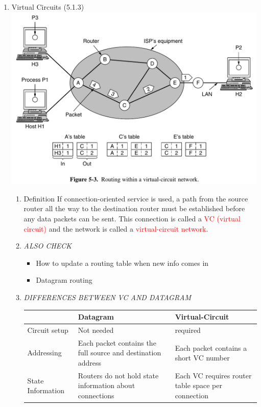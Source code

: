 \documentclass[a4paper,10pt]{article}
\newcommand{\red}[1]{\textcolor{red}{#1}}
\begin{document}
\begin{enumerate}
  \item Virtual Circuits (5.1.3)
    \newline\includegraphics[width=\textwidth]{vc}
    \begin{enumerate}
    \item Definition
      \newline If connection-oriented service is used, a path from the source router all the way to the destination router must be established before any data packets can be sent. This connection is called a \red{VC (virtual circuit)} and the network is called a \red{virtual-circuit network}.
    \item\textit{ALSO CHECK}
      \begin{itemize}
        \item How to update a routing table when new info comes in
        \item Datagram routing
      \end{itemize}
    \newpage\item\textit{DIFFERENCES BETWEEN VC AND DATAGRAM}
      \begin{table}[h]\begin{tabularx}{\textwidth}{l | X | X}
        & Datagram & Virtual-Circuit \\ \hline
        Circuit setup & Not needed & required \\ \hline
        Addressing & Each packet contains the full source and destination address & Each packet contains a short VC number \\ \hline
        State Information & Routers do not hold state information about connections & Each VC requires router table space per connection \\ \hline

\end{tabularx}
\end{table}
\end{enumerate}
\end{enumerate}
\end{document}

